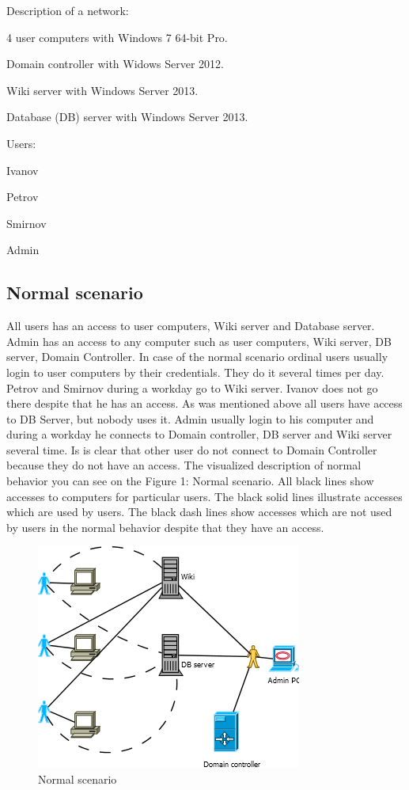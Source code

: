 Description of a network:
\begin{compactitem}
\item 4 user computers with Windows 7 64-bit Pro.
\item Domain controller with Widows Server 2012.
\item Wiki server with Windows Server 2013.
\item Database (DB) server with Windows Server 2013.
\end{compactitem}
Users: 
\begin{compactitem}
\item Ivanov
\item Petrov
\item Smirnov
\item Admin
\end{compactitem}
     
\subsection{Normal scenario}
All users has an access to user computers, Wiki server and Database server. Admin has an access to any computer such as user computers, Wiki server, DB server, Domain Controller. In case of the normal scenario ordinal users usually login to user computers by their credentials. They do it several times per day. Petrov and Smirnov during a workday go to Wiki server. Ivanov does not go there despite that he has an access. As was mentioned above all users have access to DB Server, but nobody uses it. Admin usually login to his computer and during a workday he connects to Domain controller, DB server and Wiki server several time. Is is clear that other user do not connect to Domain Controller because they do not have an access. The visualized description of normal behavior you can see on the Figure 1: Normal scenario. All black lines show accesses to computers for particular users. The black solid lines illustrate accesses which are used by users. The black dash lines show accesses which are not used by users in the normal behavior despite that they have an access. 
\begin{figure}[ht!]
\centering
\includegraphics{scenario_normal.png}
\caption{Normal scenario}
\label{overflow}
\end{figure}

